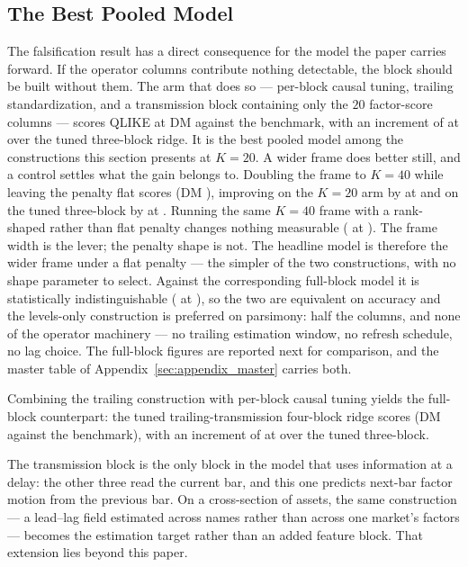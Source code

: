 \subsection{The Best Pooled Model}

The falsification result has a direct consequence for the model the paper
carries forward. If the operator columns contribute nothing detectable,
the block should be built without them. The arm that does so ---
per-block causal tuning, trailing standardization, and a transmission
block containing only the $20$ factor-score columns --- scores QLIKE
\unifBlkFourTrailGTunedQLIKE{} at DM \unifBlkFourTrailGTunedDM{} against
the benchmark, with an increment of \unifIncrBlkFourTrailGTunedDQ{} at
\unifIncrBlkFourTrailGTunedDM{} over the tuned three-block ridge. It is
the best pooled model among the constructions this section presents at
$K = 20$. A wider frame does better still, and a control settles what
the gain belongs to. Doubling the frame to $K = 40$ while leaving the
penalty flat scores \unifBlkFourTrailGFortyTunedQLIKE{} (DM
\unifBlkFourTrailGFortyTunedDM{}), improving on the $K = 20$ arm by
\unifIncrBlkFourTrailGFortyTunedDQ{} at
\unifIncrBlkFourTrailGFortyTunedDM{} and on the tuned three-block by
\unifIncrBlkFourTrailGFortyTunedVsBlkThreeTunedDQ{} at
\unifIncrBlkFourTrailGFortyTunedVsBlkThreeTunedDM{}. Running the same
$K = 40$ frame with a rank-shaped rather than flat penalty changes
nothing measurable
(\unifIncrBlkFourTrailGFortyTunedVsBlkFourTrailGShapedDQ{} at
\unifIncrBlkFourTrailGFortyTunedVsBlkFourTrailGShapedDM{}). The frame
width is the lever; the penalty shape is not. The headline model is
therefore the wider frame under a flat penalty --- the simpler of the
two constructions, with no shape parameter to select.
Against the corresponding
full-block model it is statistically indistinguishable
(\unifIncrBlkFourTrailGTunedVsBlkFourTrailTunedDQ{} at
\unifIncrBlkFourTrailGTunedVsBlkFourTrailTunedDM{}), so the two are
equivalent on accuracy and the levels-only construction is preferred on
parsimony: half the columns, and none of the operator machinery --- no
trailing estimation window, no refresh schedule, no lag choice. The
full-block figures are reported next for comparison, and the master table
of Appendix~\ref{sec:appendix_master} carries both.

Combining the trailing construction with per-block causal
tuning yields the full-block counterpart: the tuned
trailing-transmission four-block ridge scores
\unifBlkFourTrailTunedQLIKE{} (DM \unifBlkFourTrailTunedDM{} against the
benchmark), with an increment of \unifIncrBlkFourTrailTunedDQ{} at
\unifIncrBlkFourTrailTunedDM{} over the tuned three-block.

The transmission block is the only block in the model that uses information
at a delay: the other three read the current bar, and this one predicts
next-bar factor motion from the previous bar. On a cross-section of assets,
the same construction --- a lead--lag field estimated across names rather
than across one market's factors --- becomes the estimation target rather
than an added feature block. That extension lies beyond this paper.
